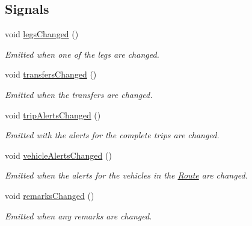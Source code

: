 \subsection*{Signals}
\begin{DoxyCompactItemize}
\item 
void \mbox{\hyperlink{classQRail_1_1RouterEngine_1_1Route_ad4fe4f0edd472e9d6158206e83c22d20}{legs\+Changed}} ()
\begin{DoxyCompactList}\small\item\em Emitted when one of the legs are changed. \end{DoxyCompactList}\item 
void \mbox{\hyperlink{classQRail_1_1RouterEngine_1_1Route_a18e2a0b5cee7cf1d0441ef811ec02423}{transfers\+Changed}} ()
\begin{DoxyCompactList}\small\item\em Emitted when the transfers are changed. \end{DoxyCompactList}\item 
void \mbox{\hyperlink{classQRail_1_1RouterEngine_1_1Route_aa3aed0599caff195331cd992be3260b5}{trip\+Alerts\+Changed}} ()
\begin{DoxyCompactList}\small\item\em Emitted with the alerts for the complete trips are changed. \end{DoxyCompactList}\item 
void \mbox{\hyperlink{classQRail_1_1RouterEngine_1_1Route_a236daca39e2006e3f0182227079113f6}{vehicle\+Alerts\+Changed}} ()
\begin{DoxyCompactList}\small\item\em Emitted when the alerts for the vehicles in the \mbox{\hyperlink{classQRail_1_1RouterEngine_1_1Route}{Route}} are changed. \end{DoxyCompactList}\item 
void \mbox{\hyperlink{classQRail_1_1RouterEngine_1_1Route_a4d3f6275111893e2b73611cc45c18adc}{remarks\+Changed}} ()
\begin{DoxyCompactList}\small\item\em Emitted when any remarks are changed. \end{DoxyCompactList}\end{DoxyCompactItemize}
